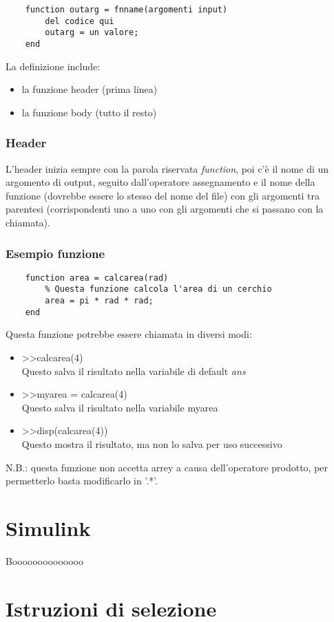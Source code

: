 \documentclass[a4paper, 10pt]{article}
\begin{document}
\begin{lstlisting}
	function outarg = fnname(argomenti input)
		del codice qui
		outarg = un valore;
	end
\end{lstlisting}
La definizione include:
\begin{itemize}
\item la funzione header (prima linea)
\item la funzione body (tutto il resto)
\end{itemize}

\subsubsection{Header}
L'header inizia sempre con la parola riservata \textit{function}, poi c'è il nome di un argomento di output, seguito dall'operatore assegnamento e il nome della funzione (dovrebbe essere lo stesso del nome del file) con gli argomenti tra parentesi (corrispondenti uno a uno con gli argomenti che si passano con la chiamata).

\subsubsection{Esempio funzione}
\begin{lstlisting}
	function area = calcarea(rad)
		% Questa funzione calcola l'area di un cerchio
		area = pi * rad * rad;
	end
\end{lstlisting}
Questa funzione potrebbe essere chiamata in diversi modi:
\begin{itemize}
\item >>calcarea(4)\\
Questo salva il risultato nella variabile di default \textit{ans}
\item >>myarea = calcarea(4)\\
Questo salva il risultato nella variabile myarea
\item >>disp(calcarea(4))\\
Questo mostra il risultato, ma non lo salva per uso successivo
\end{itemize}
N.B.: questa funzione non accetta arrey a causa dell'operatore prodotto, per permetterlo basta modificarlo in '.*'.
\newpage

\section{Simulink}
Boooooooooooooo
\newpage

\section{Istruzioni di selezione}
\end{document}
